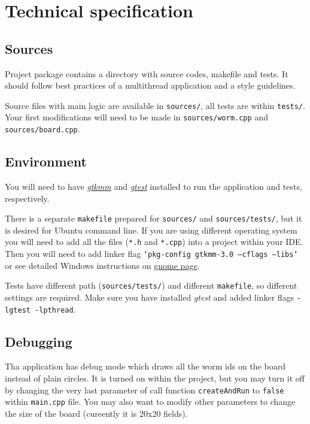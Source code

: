 \documentclass{article}
\begin{document}
\section{Technical specification}

\subsection{Sources}

Project package contains a directory with source codes, makefile and tests.
It should follow best practices of a multithread application and a style
guidelines.

Source files with main logic are available in \texttt{sources/}, all tests
are within \texttt{tests/}. Your first modifications will need to be made
in \texttt{sources/worm.cpp} and \texttt{sources/board.cpp}.

\subsection{Environment}
You will need to have \href{https://www.gtkmm.org/en/download.html}{\textit{gtkmm}}
and \href{https://github.com/google/googletest}{\textit{gtest}} installed to run
the application and tests, respectively.

There is a separate \texttt{makefile} prepared for \texttt{sources/}
and \texttt{sources/tests/}, but it is desired for Ubuntu command line.
If you are using different operating system you will need to add all
the files (\texttt{*.h} and \texttt{*.cpp}) into a project within your IDE.
Then you will need to add linker flag \texttt{`pkg-config gtkmm-3.0 --cflags --libs`}
or see detailed Windows instructions on \href{https://wiki.gnome.org/Projects/gtkmm/MSWindows}{gnome page}.

Tests have different path (\texttt{sources/tests/}) and different \texttt{makefile},
so different settings are required. Make sure you have installed \textit{gtest}
and added linker flags \texttt{-lgtest -lpthread}.

\subsection{Debugging}

Tha application has debug mode which draws all the worm ids on the board
instead of plain circles. It is turned on within the project, but you may turn
it off by changing the very last
parameter of call function \texttt{createAndRun} to \texttt{false} within
\texttt{main.cpp} file. You may also want to modify other parameters
to change the size of the board (cureently it is 20x20 fields).
\end{document}
